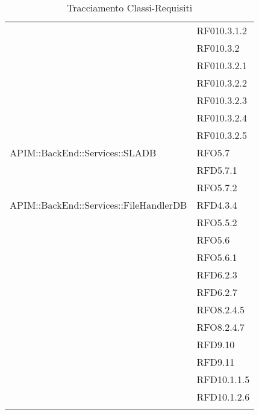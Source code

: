\begin{longtable}{ p{12cm} | p{4cm} }
	& RF010.3.1.2 \\
	& RF010.3.2 \\
	& RF010.3.2.1 \\
	& RF010.3.2.2 \\
	& RF010.3.2.3 \\
	& RF010.3.2.4 \\
	& RF010.3.2.5 \\
	\hline
	APIM::BackEnd::Services::SLADB
	& RFO5.7 \\
	& RFD5.7.1 \\
	& RFO5.7.2 \\
	\hline
	APIM::BackEnd::Services::FileHandlerDB
	& RFD4.3.4 \\
	& RFO5.5.2 \\
	& RFO5.6 \\
	& RFO5.6.1 \\
	& RFD6.2.3 \\
	& RFD6.2.7 \\
	& RFO8.2.4.5 \\
	& RFO8.2.4.7 \\
	& RFD9.10 \\
	& RFD9.11 \\
	& RFD10.1.1.5 \\
	& RFD10.1.2.6 \\
	\hline
	
	\caption{Tracciamento Classi-Requisiti}
\end{longtable}


\newpage
